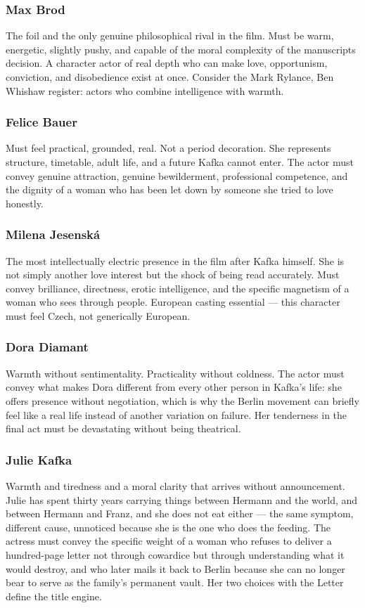 \subsubsection{Max Brod}
The foil and the only genuine philosophical rival in the film. Must be warm, energetic, slightly pushy, and capable of the moral complexity of the manuscripts decision. A character actor of real depth who can make love, opportunism, conviction, and disobedience exist at once. Consider the Mark Rylance, Ben Whishaw register: actors who combine intelligence with warmth.

\subsubsection{Felice Bauer}
Must feel practical, grounded, real. Not a period decoration. She represents structure, timetable, adult life, and a future Kafka cannot enter. The actor must convey genuine attraction, genuine bewilderment, professional competence, and the dignity of a woman who has been let down by someone she tried to love honestly.

\subsubsection{Milena Jesenská}
The most intellectually electric presence in the film after Kafka himself. She is not simply another love interest but the shock of being read accurately. Must convey brilliance, directness, erotic intelligence, and the specific magnetism of a woman who sees through people. European casting essential --- this character must feel Czech, not generically European.

\subsubsection{Dora Diamant}
Warmth without sentimentality. Practicality without coldness. The actor must convey what makes Dora different from every other person in Kafka's life: she offers presence without negotiation, which is why the Berlin movement can briefly feel like a real life instead of another variation on failure. Her tenderness in the final act must be devastating without being theatrical.

\subsubsection{Julie Kafka}
Warmth and tiredness and a moral clarity that arrives without announcement. Julie has spent thirty years carrying things between Hermann and the world, and between Hermann and Franz, and she does not eat either --- the same symptom, different cause, unnoticed because she is the one who does the feeding. The actress must convey the specific weight of a woman who refuses to deliver a hundred-page letter not through cowardice but through understanding what it would destroy, and who later mails it back to Berlin because she can no longer bear to serve as the family's permanent vault. Her two choices with the Letter define the title engine.


